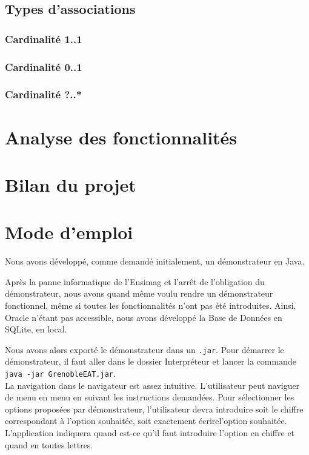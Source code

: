 \documentclass[10pt, a4paper]{article}
\begin{document}
\subsection{Types d'associations}

\subsubsection{Cardinalité 1..1}



\subsubsection{Cardinalité 0..1}



\subsubsection{Cardinalité ?..*}

\section{Analyse des fonctionnalités}
\section{Bilan du projet}
\section{Mode d'emploi}

Nous avons développé, comme demandé initialement, un démonstrateur en Java.

Après la panne informatique de l'Ensimag et l'arrêt de l'obligation du démonstrateur, nous avons quand même voulu rendre un démonstrateur fonctionnel, même si toutes les fonctionnalités n'ont pas été introduites. Ainsi, Oracle n'étant pas accessible, nous avons développé la Base de Données en SQLite, en local.

Nous avons alors exporté le démonstrateur dans un \texttt{.jar}. Pour démarrer le démonstrateur, il faut aller dans le dossier Interpréteur et lancer la commande \texttt{java -jar GrenobleEAT.jar}. \\


La navigation dans le navigateur est assez intuitive. L'utilisateur peut naviguer de menu en menu en suivant les instructions demandées. Pour sélectionner les options proposées par  démonstrateur, l'utilisateur devra introduire soit le chiffre correspondant à l'option souhaitée, soit exactement écrirel'option souhaitée. L'application indiquera quand est-ce qu'il faut introduire l'option en chiffre et quand en toutes lettres. \\
\end{document}
